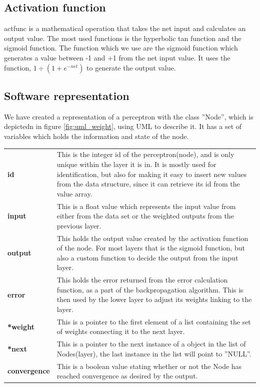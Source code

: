 \subsection{Activation function}
\gls{actfunc} is a mathematical operation that takes the net input and
calculates an output value. The most used functions is the hyperbolic tan
function and the \gls{sigmoid} function. The function which we use are the
sigmoid function which generates a value between -1 and +1 from the net input
value.  It uses the function, $1\div(1+e^{-net})$ to generate the output value.


\subsection{Software representation}
We have created a representation of a \gls{perceptron} with the class ''Node'',
which is depictedn in figure \ref{fig:uml_weight}, using UML to describe it. It
has a set of variables which holds the information and state of the node.

\begin{longtable}{ p{}  p{} }
\textbf{id} 		& 	This is the integer id of the perceptron(node), and is only unique
	within the layer it is in. It is mostly used for identification, but also for
	making it easy to insert new values from the data structure, since it can
	retrieve its id from the value array.\\
\textbf{input}	& 	This is a float value which represents the input value from
	either from the data set or the weighted outputs from the previous layer.\\
\textbf{output}	& 	This holds the output value created by the activation
	function of the node. For most layers that is the sigmoid function, but also a
	custom function to decide the output from the input layer.\\
\textbf{error}	& 	This holds the error returned from the error calculation
	function, as a part of the backpropagation algorithm.  This is then used by
	the lower layer to adjust its weights linking to the layer.\\
\textbf{*weight}& 	This is a pointer to the first element of a list containing
	the set of weights connecting it to the next layer.\\
\textbf{*next}	& 	This is a pointer to the next instance of a object in the
	list of Nodes(layer), the last instance in the list will point to ''NULL''.\\
\textbf{convergence} &	This is a boolean value stating whether or not the Node
	has reached convergence as desired by the output.\\
\end{longtable}



